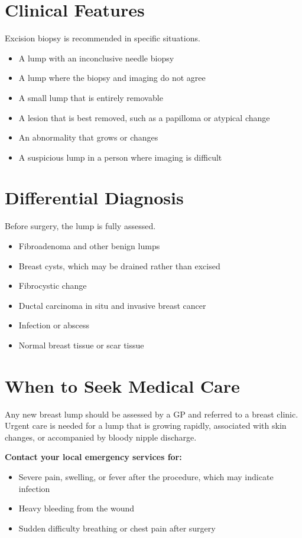 \section*{Clinical Features}
Excision biopsy is recommended in specific situations.
\begin{itemize}
    \item A lump with an inconclusive needle biopsy
    \item A lump where the biopsy and imaging do not agree
    \item A small lump that is entirely removable
    \item A lesion that is best removed, such as a papilloma or atypical change
    \item An abnormality that grows or changes
    \item A suspicious lump in a person where imaging is difficult
\end{itemize}

\section*{Differential Diagnosis}
Before surgery, the lump is fully assessed.
\begin{itemize}
    \item Fibroadenoma and other benign lumps
    \item Breast cysts, which may be drained rather than excised
    \item Fibrocystic change
    \item Ductal carcinoma in situ and invasive breast cancer
    \item Infection or abscess
    \item Normal breast tissue or scar tissue
\end{itemize}

\section*{When to Seek Medical Care}
Any new breast lump should be assessed by a GP and referred to a breast clinic. Urgent care is needed for a lump that is growing rapidly, associated with skin changes, or accompanied by bloody nipple discharge.

\textbf{Contact your local emergency services for:}
\begin{itemize}
    \item Severe pain, swelling, or fever after the procedure, which may indicate infection
    \item Heavy bleeding from the wound
    \item Sudden difficulty breathing or chest pain after surgery
\end{itemize}

